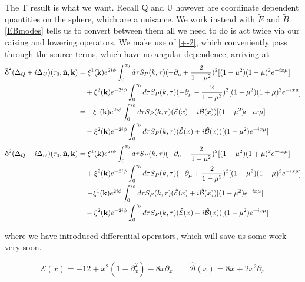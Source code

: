 \documentclass[a4paper,10pt]{article}
\renewcommand{\v}[1]{\mathbf{#1}}
\newcommand{\unit}[1]{\hat{\v{#1}}}
\newcommand{\sr}{\text{\normalfont\dh}}
\renewcommand{\sl}{\bar{\text{\normalfont\dh}}}
\begin{document}
The T result is what we want. Recall Q and U however are coordinate dependent quantities on the sphere, which are a nuisance. We work instead with $\tilde{E}$ and $\tilde{B}$. \ref{EBmodes} tells us to convert between them all we need to do is act twice via our raising and lowering operators. We make use of \ref{+-2}, which conveniently pass through the source terms, which have no angular dependence, arriving at
\begin{equation}\begin{split}
\sl^2(\Delta_Q+i\Delta_U)(\tau_0,\unit{n},\v{k}) &= \xi^1(\v{k})e^{2i\phi}\int_0^{\tau_0}d\tau S_P(k,\tau)(-\partial_\mu+\frac{2}{1-\mu^2})^2[(1-\mu^2)(1-\mu)^2 e^{-ix\mu}]\\
&\quad + \xi^2(\v{k})e^{-2i\phi}\int_0^{\tau_0}d\tau S_P(k,\tau)(-\partial_\mu-\frac{2}{1-\mu^2})^2[(1-\mu^2)(1+\mu)^2 e^{-ix\mu}]\\
&= -\xi^1(\v{k})e^{2i\phi}\int_0^{\tau_0}d\tau S_P(k,\tau)(\hat{\mathcal{E}}(x)-i\hat{\mathcal{B}}(x))[(1-\mu^2) e^-{ix\mu}] \\
&\quad - \xi^2(\v{k})e^{-2i\phi}\int_0^{\tau_0}d\tau S_P(k,\tau)(\hat{\mathcal{E}}(x)+i\hat{\mathcal{B}}(x))[(1-\mu^2) e^{-ix\mu}] 
\end{split}\end{equation}
\begin{equation}\begin{split}
\sr^2(\Delta_Q-i\Delta_U)(\tau_0,\unit{n},\v{k}) &= \xi^1(\v{k})e^{2i\phi}\int_0^{\tau_0}d\tau S_P(k,\tau)(-\partial_\mu-\frac{2}{1-\mu^2})^2[(1-\mu^2)(1+\mu)^2 e^{-ix\mu}] \\ 
&\quad + \xi^2(\v{k})e^{-2i\phi}\int_0^{\tau_0}d\tau S_P(k,\tau)(-\partial_\mu+\frac{2}{1-\mu^2})^2[(1-\mu^2)(1-\mu)^2 e^{-ix\mu}]\\
&= -\xi^1(\v{k})e^{2i\phi}\int_0^{\tau_0}d\tau S_P(k,\tau)(\hat{\mathcal{E}}(x)+i\hat{\mathcal{B}}(x))[(1-\mu^2) e^{-ix\mu}] \\
&\quad - \xi^2(\v{k})e^{-2i\phi}\int_0^{\tau_0}d\tau S_P(k,\tau)(\hat{\mathcal{E}}(x)-i\hat{\mathcal{B}}(x))[(1-\mu^2) e^{-ix\mu}] 
\end{split}\end{equation}

where we have introduced differential operators, which will save us some work very soon.

\begin{equation}
\hat{\mathcal{E}}(x)=-12+x^2(1-\partial^2_x)-8x\partial_x \qquad \mathcal{\hat{B}}(x) = 8x+2x^2\partial_x
\end{equation}
\end{document}
